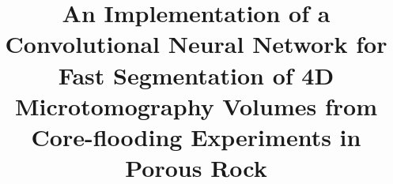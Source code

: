 \documentclass[draft,linenumbers]{agujournal2018}
\begin{document}
%
%


\title{An Implementation of a Convolutional Neural Network for Fast Segmentation of 4D Microtomography Volumes from Core-flooding Experiments in Porous Rock}

%
%










\end{document}
